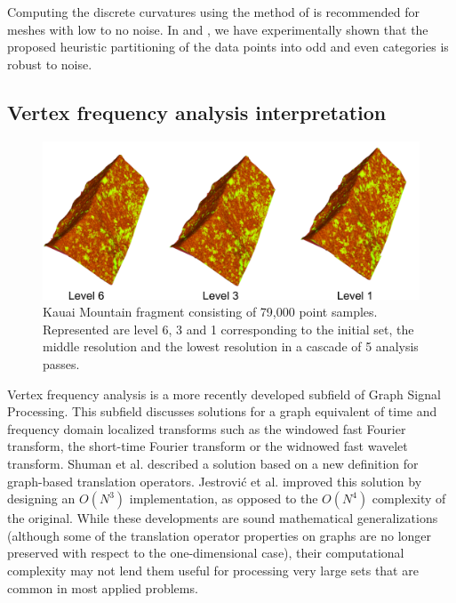 \documentclass[graybox]{svmult}
\begin{document}
Computing the discrete curvatures using the method of \cite{Meyer2003} is recommended for meshes with low to no noise. In \cite{Cioaca2016} and \cite{Cioaca2016CEAI}, we have experimentally shown that the proposed heuristic partitioning of the data points into odd and even categories is robust to noise.

\subsection{Vertex frequency analysis interpretation}
\begin{figure}[!htbp]
	\centering
	\includegraphics[width=1\linewidth]{Kauai5.pdf}
	\caption{\label{fig_cds:Kauai}
		Kauai Mountain fragment consisting of 79,000 point samples. Represented are level 6, 3 and 1 corresponding to the initial set, the middle resolution and the lowest resolution in a cascade of 5 analysis passes. }
\end{figure}

Vertex frequency analysis is a more recently developed subfield of Graph Signal Processing. This subfield discusses solutions for a graph equivalent of time and frequency domain localized transforms such as the windowed fast Fourier transform, the short-time Fourier transform or the widnowed fast wavelet transform. Shuman et al. \cite{Shuman2016} described a solution based on a new definition for graph-based translation operators. Jestrovi\'c et al.  \cite{Jestrovic2017} improved this solution by designing an $O(N^3)$ implementation, as opposed to the  $O(N^4)$ complexity of the original.  While these developments are sound mathematical generalizations (although some of the translation operator properties on graphs are no longer preserved with respect to the one-dimensional case), their computational complexity may not lend them useful for processing very large sets that are common in most applied problems.
\end{document}
